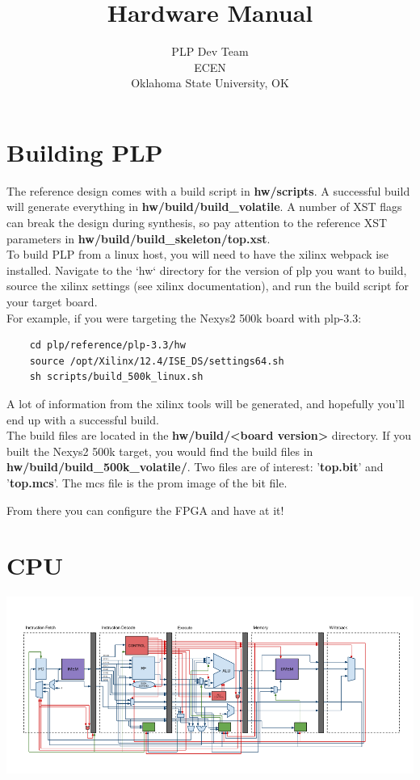 \documentclass{article}
\begin{document}
\title{Hardware Manual}
\author{PLP Dev Team\\
        ECEN \\
        Oklahoma State University, OK}
        
\maketitle
\pagebreak
\tableofcontents

\newpage

\section{Building PLP}
	The reference design comes with a build script in \textbf{hw/scripts}. A successful build will generate everything in \textbf{hw/build/build\_volatile}.
	A number of XST flags can break the design during synthesis, so pay attention to the reference XST parameters in \textbf{hw/build/build\_skeleton/top.xst}.\\


To build PLP from a linux host, you will need to have the xilinx webpack ise installed. Navigate to the `hw` directory for the version of plp you want to build, source the xilinx settings (see xilinx documentation), and run the build script for your target board.\\ 

For example, if you were targeting the Nexys2 500k board with plp-3.3:

\begin{verbatim}
    cd plp/reference/plp-3.3/hw
    source /opt/Xilinx/12.4/ISE_DS/settings64.sh
    sh scripts/build_500k_linux.sh
\end{verbatim}
A lot of information from the xilinx tools will be generated, and hopefully you'll end up with a successful build.\\

The build files are located in the \textbf{hw/build/\textless board version\textgreater} directory. If you built the Nexys2 500k target, you would find the build files in \textbf{hw/build/build\_500k\_volatile/}.
Two files are of interest: '\textbf{top.bit}' and '\textbf{top.mcs}'. The mcs file is the prom image of the bit file.

From there you can configure the FPGA and have at it!
\pagebreak


\section{CPU}
\includegraphics[scale=0.6]{../../images/CPUDiagram.png} 
\end{document}
